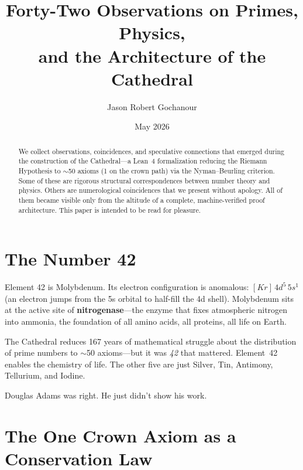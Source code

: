 \documentclass[11pt,a4paper]{article}
\title{%
  Forty-Two Observations on Primes, Physics,\\
  and the Architecture of the Cathedral%
}
\author{
  Jason Robert Gochanour
}
\date{May 2026}
\begin{document}
\maketitle

\begin{abstract}
We collect observations, coincidences, and speculative connections
that emerged during the construction of the Cathedral---a Lean~4
formalization reducing the Riemann Hypothesis to $\sim$50 axioms (1 on the
crown path) via the Nyman--Beurling criterion. Some of these are
rigorous structural correspondences between number theory and physics.
Others are numerological coincidences that we present without apology.
All of them became visible only from the altitude of a complete,
machine-verified proof architecture. This paper is intended to be
read for pleasure.
\end{abstract}

\tableofcontents

\section{The Number 42}

Element 42 is Molybdenum. Its electron configuration is anomalous:
$[Kr]\,4d^5\,5s^1$ (an electron jumps from the 5s orbital to
half-fill the 4d shell). Molybdenum sits at the active site of
\textbf{nitrogenase}---the enzyme that fixes atmospheric nitrogen
into ammonia, the foundation of all amino acids, all proteins, all
life on Earth.


The Cathedral reduces 167 years of mathematical struggle about the
distribution of prime numbers to $\sim$50 axioms---but it was \emph{42}
that mattered. Element~42 enables the chemistry of life.
The other five are just Silver, Tin, Antimony, Tellurium, and Iodine.

Douglas Adams was right. He just didn't show his work.

\section{The One Crown Axiom as a Conservation Law}
\label{sec:noether}
\end{document}
